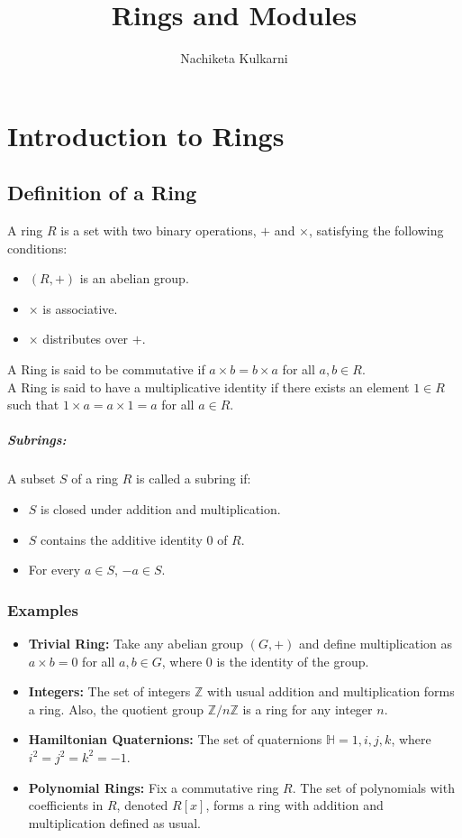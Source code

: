 \documentclass[12pt, oneside]{book}
\date{}
\title{Rings and Modules}
\author{Nachiketa Kulkarni}
\begin{document}
\maketitle
\tableofcontents

\mainmatter
\chapter{Introduction to Rings}
\section{Definition of a Ring}
A ring \(R\) is a set with two binary operations, \(+\) and \(\times\), satisfying the following conditions:
\begin{itemize}
    \item \(\left(R,+\right)\) is an abelian group.
    \item \(\times\) is associative.
    \item \(\times\) distributes over \(+\).
\end{itemize}
A Ring is said to be commutative if \(a \times b = b \times a\) for all \(a, b \in R\).\\
A Ring is said to have a multiplicative identity if there exists an element \(1 \in R\) such that \(1 \times a = a \times 1 = a\) for all \(a \in R\).\\

\paragraph{Subrings:} A subset \(S\) of a ring \(R\) is called a subring if:
\begin{itemize}
    \item \(S\) is closed under addition and multiplication.
    \item \(S\) contains the additive identity \(0\) of \(R\).
    \item For every \(a \in S\), \(-a \in S\).
\end{itemize}
\subsection{Examples}
\begin{itemize}
    \item \textbf{Trivial Ring:} Take any abelian group \((G,+)\) and define multiplication as \(a \times b = 0\) for all \(a, b \in G\), where \(0\) is the identity of the group.
    \item \textbf{Integers:} The set of integers \(\mathbb{Z}\) with usual addition and multiplication forms a ring.
    Also, the quotient group \(\mathbb{Z}/n\mathbb{Z}\) is a ring for any integer \(n\).
    \item \textbf{Hamiltonian Quaternions:} The set of quaternions \(\mathbb{H} = {1, i, j, k}\), where \(i^2 = j^2 = k^2 = -1\).
    \item \textbf{Polynomial Rings:} Fix a commutative ring \(R\).
    The set of polynomials with coefficients in \(R\), denoted \(R[x]\), forms a ring with addition and multiplication defined as usual.
\end{itemize}
\end{document}
